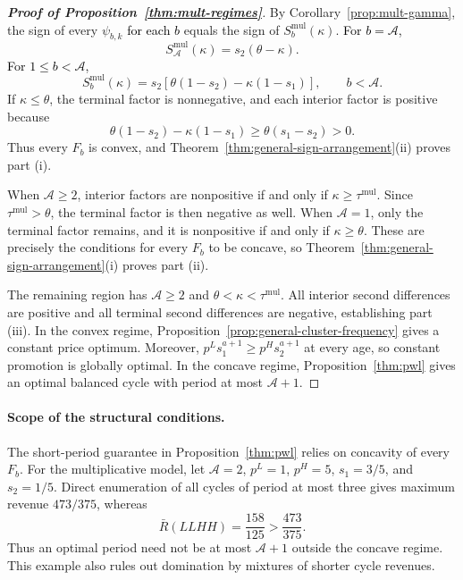 \begin{proof}[\normalfont\bfseries Proof of Proposition~\ref{thm:mult-regimes}]
By Corollary~\ref{prop:mult-gamma}, the sign of every \(\psi_{b,k}\) \textcolor{black}{for each \(b\)} equals the sign of \(S_b^{\mathrm{mul}}(\kappa)\). \textcolor{black}{For \(b=\mathcal A\),}
\[
 S_{\mathcal A}^{\mathrm{mul}}(\kappa)=s_2(\theta-\kappa).
\]
\textcolor{black}{For \(1\le b<\mathcal A\),}
\[
 S_b^{\mathrm{mul}}(\kappa)
 =s_2[\theta(1-s_2)-\kappa(1-s_1)],
 \qquad b<\mathcal A.
\]
If \(\kappa\le\theta\), the terminal factor is nonnegative, and each interior factor is positive because
\[
 \theta(1-s_2)-\kappa(1-s_1)
 \ge\theta(s_1-s_2)>0.
\]
Thus every \(F_b\) is convex, and Theorem~\ref{thm:general-sign-arrangement}(ii) proves part (i).

When \(\mathcal A\ge2\), interior factors are nonpositive if and only if \(\kappa\ge\tau^{\mathrm{mul}}\). Since \(\tau^{\mathrm{mul}}>\theta\), the terminal factor is then negative as well. When \(\mathcal A=1\), only the terminal factor remains, and it is nonpositive if and only if \(\kappa\ge\theta\). These are precisely the conditions for every \(F_b\) to be concave, so Theorem~\ref{thm:general-sign-arrangement}(i) proves part (ii).

The remaining region has \(\mathcal A\ge2\) and \(\theta<\kappa<\tau^{\mathrm{mul}}\). All interior second differences are positive and all terminal second differences are negative, establishing part (iii). In the convex regime, Proposition~\ref{prop:general-cluster-frequency} gives a constant price optimum. Moreover, \(p^Ls_1^{a+1}\ge p^Hs_2^{a+1}\) at every age, so constant promotion is globally optimal. In the concave regime, Proposition~\ref{thm:pwl} gives an optimal balanced cycle with period at most \(\mathcal A+1\).
\end{proof}

\paragraph{Scope of the structural conditions.}
The short-period guarantee in Proposition~\ref{thm:pwl} relies on concavity of every \(F_b\). For the multiplicative model, let \(\mathcal A=2\), \(p^L=1\), \(p^H=5\), \(s_1=3/5\), and \(s_2=1/5\). Direct enumeration of all cycles of period at most three gives maximum revenue \(473/375\), whereas
\[
 \bar R(LLHH)=\frac{158}{125}>\frac{473}{375}.
\]
Thus an optimal period need not be at most \(\mathcal A+1\) outside the concave regime. This example also rules out domination by mixtures of shorter cycle revenues.
